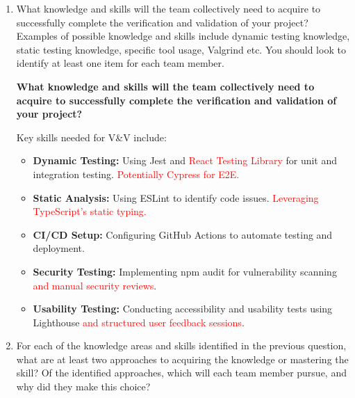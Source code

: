 \documentclass[12pt, titlepage]{article}
\begin{document}
\begin{enumerate}
  \item What knowledge and skills will the team collectively need to acquire to
  successfully complete the verification and validation of your project?
  Examples of possible knowledge and skills include dynamic testing knowledge,
  static testing knowledge, specific tool usage, Valgrind etc.  You should look to
  identify at least one item for each team member.


    \textbf{What knowledge and skills will the team collectively need to acquire to successfully complete the verification and validation of your project?}

    Key skills needed for V\&V include:

    \begin{itemize}
        \item \textbf{Dynamic Testing:} Using Jest and \textcolor{red}{React Testing Library} for unit and integration testing. \textcolor{red}{Potentially Cypress for E2E.}
        \item \textbf{Static Analysis:} Using ESLint to identify code issues. \textcolor{red}{Leveraging TypeScript's static typing.}
        \item \textbf{CI/CD Setup:} Configuring GitHub Actions to automate testing and deployment.
        \item \textbf{Security Testing:} Implementing npm audit for vulnerability scanning \textcolor{red}{and manual security reviews}.
        \item \textbf{Usability Testing:} Conducting accessibility and usability tests using Lighthouse \textcolor{red}{and structured user feedback sessions}.
    \end{itemize}

  \item For each of the knowledge areas and skills identified in the previous
  question, what are at least two approaches to acquiring the knowledge or
  mastering the skill?  Of the identified approaches, which will each team
  member pursue, and why did they make this choice?


\end{enumerate}
\end{document}
